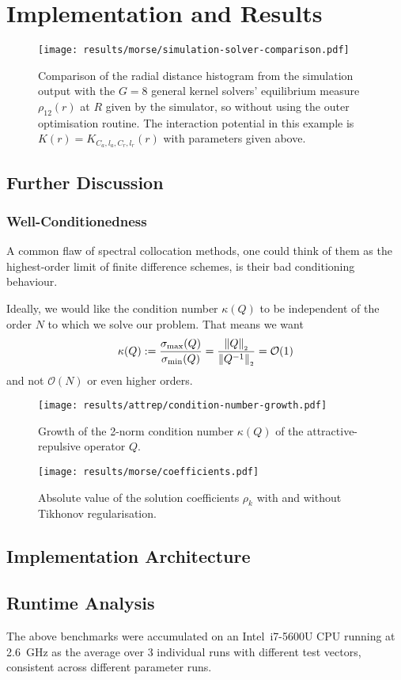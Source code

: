 \chapter{Implementation and Results}
\label{chap:implementation-and-results}

% 

\begin{figure}[H]
  \centering
  \label{fig:simulation-solver-comparison}
  \texttt{[image: results/morse/simulation-solver-comparison.pdf]}
  \caption[Comparison of histogram and spectral method solution]{Comparison of the radial distance histogram from the simulation output with the $G = 8$ general kernel solvers' equilibrium measure $\rho_{12}(r)$ at $R$ given by the simulator, so without using the outer optimisation routine. The interaction potential in this example is $K(r) = K_{C_a, l_a, C_r, l_r}(r)$ with parameters given above.}
\end{figure}

\section{Further Discussion}
\subsection{Well-Conditionedness}
A common flaw of spectral collocation methods, one could think of them as the highest-order limit of finite difference schemes, is their bad conditioning behaviour.

Ideally, we would like the condition number $\kappa(Q)$ to be independent of the order $N$ to which we solve our problem. That means we want
$$\kappa(Q) := \frac{\sigma_{\rm max}(Q)}{\sigma_{\rm min}(Q)} = \frac{\left\lVert Q\right\rVert_{\scriptscriptstyle 2}}{\left\lVert Q^{-1}\right\rVert_{\scriptscriptstyle 2}} = \mathcal{O}(1)$$
and not $\mathcal{O}(N)$ or even higher orders.

\begin{figure}[H]
  \centering
  \label{fig:condition-number-growth}
  \texttt{[image: results/attrep/condition-number-growth.pdf]}
  \caption[Growth of the condition number]{Growth of the 2-norm condition number $\kappa(Q)$ of the attractive-repulsive operator $Q$.}
\end{figure}

\begin{figure}[H]
  \centering
  \label{fig:coefficients}
  \texttt{[image: results/morse/coefficients.pdf]}
  \caption[Absolute value of the coefficients with and without regularisation]{Absolute value of the solution coefficients $\rho_k$ with and without Tikhonov regularisation.}
\end{figure}

\section{Implementation Architecture}
\section{Runtime Analysis}
The above benchmarks were accumulated on an Intel\textregistered \, i7-5600U CPU running at \SI{2.6}{\giga\hertz} as the average over 3 individual runs with different test vectors, consistent across different parameter runs.
